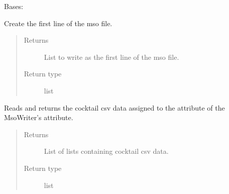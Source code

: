\documentclass[letterpaper,10pt,english]{sphinxmanual}
\begin{document}
\begin{fulllineitems}
\label{\detokenize{polo.utils:polo.utils.io_utils.MsoWriter}}
Bases: {\hyperref[\detokenize{polo.utils:polo.utils.io_utils.RunSerializer}]{}}

\begin{fulllineitems}
\label{\detokenize{polo.utils:polo.utils.io_utils.MsoWriter.first_line}}
Create the first line of the mso file.
\begin{quote}\begin{description}
\item[{Returns}] \leavevmode
List to write as the first line of the mso file.

\item[{Return type}] \leavevmode
list

\end{description}\end{quote}

\end{fulllineitems}


\begin{fulllineitems}
\label{\detokenize{polo.utils:polo.utils.io_utils.MsoWriter.get_cocktail_csv_data}}
Reads and returns the cocktail csv data assigned
to the  
attribute of the MsoWriter’s
 attribute.
\begin{quote}\begin{description}
\item[{Returns}] \leavevmode
List of lists containing cocktail csv data.

\item[{Return type}] \leavevmode
list


\end{description}
\end{quote}
\end{fulllineitems}
\end{fulllineitems}
\end{document}
